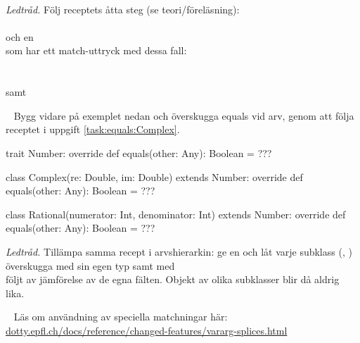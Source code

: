 \SOLUTION


\TaskSolved \what
~\\\emph{Ledtråd.} Följ receptets åtta steg (se teori/föreläsning): \\\\och en\\ som har ett match-uttryck med dessa fall:\\ \\\\samt \\



\QUESTEND







\QUESTBEGIN

\Task  \what~ Bygg vidare på exemplet nedan och överskugga equals vid arv, genom att följa receptet i uppgift \ref{task:equals:Complex}.
\begin{Code}
trait Number:
  override def equals(other: Any): Boolean = ???

class Complex(re: Double, im: Double) extends Number:
  override def equals(other: Any): Boolean = ???

class Rational(numerator: Int, denominator: Int) extends Number:
  override def equals(other: Any): Boolean = ???
\end{Code}


\SOLUTION


\TaskSolved \what
\emph{Ledtråd.} Tillämpa samma recept i arvshierarkin: ge  en  och låt varje subklass (, ) överskugga  med sin egen typ samt  med \\ följt av jämförelse av de egna fälten. Objekt av olika subklasser blir då aldrig lika.



\QUESTEND







\QUESTBEGIN

\Task  \what~ Läs om användning av speciella matchningar här: \\
\href{https://dotty.epfl.ch/docs/reference/changed-features/vararg-splices.html}{dotty.epfl.ch/docs/reference/changed-features/vararg-splices.html}

